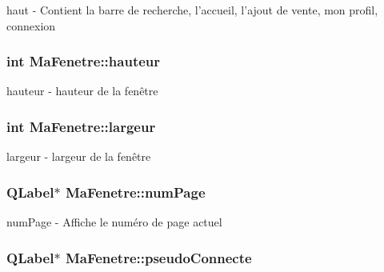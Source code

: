 haut -\/ Contient la barre de recherche, l'accueil, l'ajout de vente, mon profil, connexion 

\hypertarget{class_ma_fenetre_ae1a802d46705239d08d3bf06cd99b802}{
\subsubsection[{hauteur}]{\setlength{\rightskip}{0pt plus 5cm}int Ma\-Fenetre\-::hauteur\hspace{0.3cm}{\ttfamily [protected]}}}\label{class_ma_fenetre_ae1a802d46705239d08d3bf06cd99b802}


hauteur -\/ hauteur de la fenêtre 

\hypertarget{class_ma_fenetre_abe37db89fd8895cc34ccc0f5cda67aaf}{
\subsubsection[{largeur}]{\setlength{\rightskip}{0pt plus 5cm}int Ma\-Fenetre\-::largeur\hspace{0.3cm}{\ttfamily [protected]}}}\label{class_ma_fenetre_abe37db89fd8895cc34ccc0f5cda67aaf}


largeur -\/ largeur de la fenêtre 

\hypertarget{class_ma_fenetre_a941eff753d1e20d0ef212aa875570330}{
\subsubsection[{num\-Page}]{\setlength{\rightskip}{0pt plus 5cm}Q\-Label$\ast$ Ma\-Fenetre\-::num\-Page\hspace{0.3cm}{\ttfamily [protected]}}}\label{class_ma_fenetre_a941eff753d1e20d0ef212aa875570330}


num\-Page -\/ Affiche le numéro de page actuel 

\hypertarget{class_ma_fenetre_ae7932944c172401e793af721335e7c3d}{
\subsubsection[{pseudo\-Connecte}]{\setlength{\rightskip}{0pt plus 5cm}Q\-Label$\ast$ Ma\-Fenetre\-::pseudo\-Connecte\hspace{0.3cm}{\ttfamily [protected]}}}\label{class_ma_fenetre_ae7932944c172401e793af721335e7c3d}


